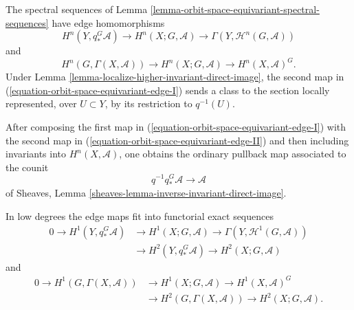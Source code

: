 \begin{lemma}
\label{lemma-orbit-space-equivariant-spectral-sequence-edges}
\begin{reference}
\cite[Chapter V, \S 5.2, (5.2.6)--(5.2.9), p. 201]{Tohoku}
\end{reference}
The spectral sequences of Lemma
\ref{lemma-orbit-space-equivariant-spectral-sequences} have edge
homomorphisms
\begin{equation}
\label{equation-orbit-space-equivariant-edge-I}
H^n(Y, q_*^G\mathcal{A})
\longrightarrow
H^n(X; G, \mathcal{A})
\longrightarrow
\Gamma(Y, \mathcal{H}^n(G, \mathcal{A}))
\end{equation}
and
\begin{equation}
\label{equation-orbit-space-equivariant-edge-II}
H^n(G, \Gamma(X, \mathcal{A}))
\longrightarrow
H^n(X; G, \mathcal{A})
\longrightarrow
H^n(X, \mathcal{A})^G.
\end{equation}
Under Lemma \ref{lemma-localize-higher-invariant-direct-image}, the second
map in
(\ref{equation-orbit-space-equivariant-edge-I}) sends a class to the section
locally represented, over $U \subset Y$, by its restriction to
$q^{-1}(U)$.

After composing the first map in
(\ref{equation-orbit-space-equivariant-edge-I}) with the second map in
(\ref{equation-orbit-space-equivariant-edge-II}) and then including
invariants into $H^n(X, \mathcal{A})$, one obtains the ordinary pullback map
associated to the counit
$$
q^{-1}q_*^G\mathcal{A} \longrightarrow \mathcal{A}
$$
of Sheaves, Lemma
\ref{sheaves-lemma-inverse-invariant-direct-image}.

In low degrees the edge maps fit into functorial exact sequences
$$
\begin{aligned}
0 \longrightarrow H^1(Y, q_*^G\mathcal{A})
&\longrightarrow H^1(X; G, \mathcal{A})
\longrightarrow \Gamma(Y, \mathcal{H}^1(G, \mathcal{A})) \\
&\longrightarrow H^2(Y, q_*^G\mathcal{A})
\longrightarrow H^2(X; G, \mathcal{A})
\end{aligned}
$$
and
$$
\begin{aligned}
0 \longrightarrow H^1(G, \Gamma(X, \mathcal{A}))
&\longrightarrow H^1(X; G, \mathcal{A})
\longrightarrow H^1(X, \mathcal{A})^G \\
&\longrightarrow H^2(G, \Gamma(X, \mathcal{A}))
\longrightarrow H^2(X; G, \mathcal{A}).
\end{aligned}
$$
\end{lemma}

